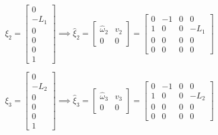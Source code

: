 \begin{equation*}
    \xi_{2}
    =
    \begin{bmatrix}
        0    \\
        -L_1 \\
        0    \\
        0    \\
        0    \\
        1
    \end{bmatrix}
    \implies
    \widehat{\xi}_{2}
    =
    \begin{bmatrix}
        \widehat{\omega}_{2} & v_2 \\
        0                    & 0
    \end{bmatrix}
    =
    \begin{bmatrix}
        0 & -1 & 0 & 0    \\
        1 & 0  & 0 & -L_1 \\
        0 & 0  & 0 & 0    \\
        0 & 0  & 0 & 0
    \end{bmatrix}
\end{equation*}

\begin{equation*}
    \xi_{3}
    =
    \begin{bmatrix}
        0    \\
        -L_2 \\
        0    \\
        0    \\
        0    \\
        1
    \end{bmatrix}
    \implies
    \widehat{\xi}_{3}
    =
    \begin{bmatrix}
        \widehat{\omega}_{3} & v_3 \\
        0                    & 0
    \end{bmatrix}
    =
    \begin{bmatrix}
        0 & -1 & 0 & 0    \\
        1 & 0  & 0 & -L_2 \\
        0 & 0  & 0 & 0    \\
        0 & 0  & 0 & 0
    \end{bmatrix}
\end{equation*}

